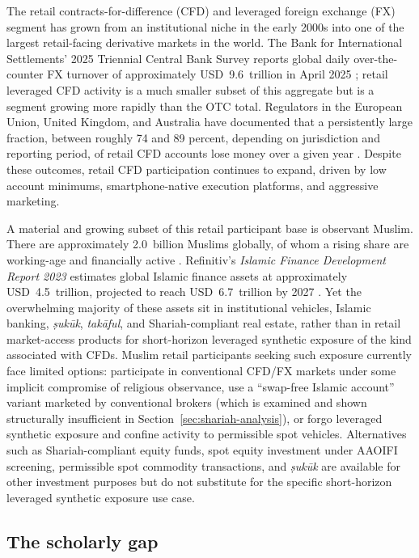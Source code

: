 \documentclass[preprint,12pt,authoryear]{elsarticle}
\theoremstyle{definition}
\begin{document}
The retail contracts-for-difference (CFD) and leveraged foreign
exchange (FX) segment has grown from an institutional niche in the
early 2000s into one of the largest retail-facing derivative
markets in the world. The Bank for International Settlements'
2025 Triennial Central Bank Survey reports global daily
over-the-counter FX turnover of approximately
USD~9.6~trillion in April 2025 \citep{BIS2025}; retail leveraged
CFD activity is a much smaller subset of this aggregate but is a
segment growing more rapidly than the OTC total. Regulators in
the European Union, United Kingdom, and Australia have documented
that a persistently large fraction, between roughly 74 and 89
percent, depending on jurisdiction and reporting period, of
retail CFD accounts lose money over a given year
\citep{ESMA2018,ASIC2020,FCA2022}. Despite these outcomes, retail CFD
participation continues to expand, driven by low account minimums,
smartphone-native execution platforms, and aggressive marketing.

A material and growing subset of this retail participant base is
observant Muslim. There are approximately 2.0~billion Muslims globally,
of whom a rising share are working-age and financially active
\citep{Pew2015}. Refinitiv's \emph{Islamic Finance Development Report
2023} estimates global Islamic finance assets at approximately
USD~4.5~trillion, projected to reach USD~6.7~trillion by 2027
\citep{Refinitiv2023}. Yet the overwhelming majority of these assets
sit in institutional vehicles, Islamic banking, \emph{\d{s}uk\={u}k},
\emph{tak\={a}ful}, and Shariah-compliant real estate, rather than
in retail market-access products for short-horizon leveraged synthetic
exposure of the kind associated with CFDs. Muslim retail participants
seeking such exposure currently face limited options: participate in
conventional CFD/FX markets under some implicit compromise of
religious observance, use a ``swap-free Islamic account'' variant
marketed by conventional brokers (which is examined and shown
structurally insufficient in
Section~\ref{sec:shariah-analysis}), or forgo leveraged synthetic
exposure and confine activity to permissible spot vehicles.
Alternatives such as Shariah-compliant equity funds, spot equity
investment under AAOIFI screening, permissible spot commodity
transactions, and \emph{\d{s}uk\={u}k} are available for other
investment purposes but do not substitute for the specific
short-horizon leveraged synthetic exposure use case.

\subsection{The scholarly gap}
\label{sec:gap}
\end{document}
